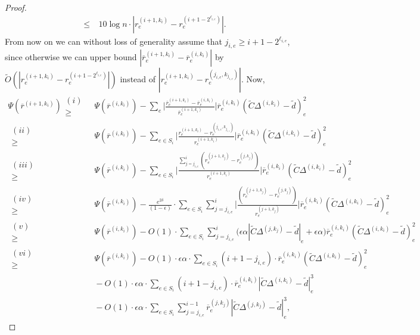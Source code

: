 \documentclass[11pt]{article}
\newcommand\dd{\boldsymbol{\mathit{d}}}
\newcommand\rr{\boldsymbol{\mathit{r}}}
\newcommand\rrbar{\overline{\boldsymbol{\mathit{r}}}}
\newcommand\CC{\boldsymbol{\mathit{C}}}
\newcommand{\wt}{\widetilde}
\newcommand{\ov}{\overline}
\begin{document}
\begin{proof}
\begin{align*}
\leq &~ 10 \log n\cdot |\rr^{(i+1,k_i)}_e - \rr^{(i+1-2^{\ell_{i,e}})}_e|.
\end{align*}
From now on we can without loss of generality assume that $j_{i,e} \geq i+1-2^{\ell_{i,e}}$, since otherwise we can upper bound $|\ov{\rr}^{(i+1,k_i)}_e - \ov{\rr}^{(i ,k_i)}_e|$ by $\wt{O}(|\rr^{(i+1,k_i)}_e - \rr^{(i+1-2^{\ell_{i,e}})}_e|)$ instead of $|\rr_e^{(i+1,k_i)} - \rr_e^{(j_{i,e},k_{j_{i,e}})}|$.
Now,
\begin{align*}
\Psi(\ov{\rr}^{(i+1,k_i)}) 
\substack{(i)\\ \geq} &~ \Psi(\ov{\rr}^{(i,k_i)}) - \sum_e \Big|\frac{\rrbar_e^{(i+1,k_i)}-\ov{\rr}^{(i,k_i)}_e}{\ov{\rr}_e^{(i+1,k_i)}} \Big| \ov{\rr}^{(i,k_i)}_e (\wt{\CC}\Delta^{(i,k_i)}-\wt{\dd})_e^2\\
\substack{(ii)\\ \geq}&~ \Psi(\ov{\rr}^{(i,k_i)}) - \sum_{e \in S_i} \Big|\frac{\rr_e^{(i+1,k_i)} - \rr_e^{(j_{i,e},k_{j_{i,e}})}}{\rr_e^{(i+1,k_i)}} \Big| \ov{\rr}^{(i,k_i)}_e (\wt{\CC}\Delta^{(i,k_i)}-\wt{\dd})_e^2 \\
\substack{(iii)\\ \geq} &~ \Psi(\ov{\rr}^{(i,k_i)}) - \sum_{e \in S_i} \Big|\frac{\sum_{j=j_{i,e}}^{i} (\rr_e^{(j+1,k_j)} - \rr_e^{(j,k_j)}) }{\rr_e^{(i+1,k_i)}} \Big| \ov{\rr}^{(i,k_i)}_e (\wt{\CC}\Delta^{(i,k_i)}-\wt{\dd})_e^2 \\
\substack{(iv)\\ \geq} &~ \Psi(\ov{\rr}^{(i,k_i)}) - \frac{e^{2\delta}}{(1-\epsilon)} \cdot \sum_{e \in S_i} \sum_{j=j_{i,e}}^{i} \Big|\frac{ (\rr_e^{(j+1,k_j)} - \rr_e^{(j,k_j)}) }{\rr_e^{(j+1,k_j)}} \Big| \ov{\rr}^{(i,k_i)}_e (\wt{\CC}\Delta^{(i,k_i)}-\wt{\dd})_e^2 \\
\substack{(v)\\ \geq} &~ \Psi(\ov{\rr}^{(i,k_i)}) - O(1) \cdot \sum_{e \in S_i} \sum_{j=j_{i,e}}^{i} \Big(  \epsilon\alpha |\wt{\CC}\Delta^{(j,k_j)}-\wt{\dd}|_e + \epsilon\alpha \Big) \ov{\rr}^{(i,k_i)}_e (\wt{\CC}\Delta^{(i,k_i)}-\wt{\dd})_e^2 \\
\substack{(vi)\\ \geq} &~ \Psi(\ov{\rr}^{(i,k_i)}) - O(1) \cdot \epsilon \alpha \cdot \sum_{e \in S_i} (i + 1 - j_{i,e}) \cdot \ov{\rr}^{(i,k_i)}_e (\wt{\CC}\Delta^{(i,k_i)}-\wt{\dd})_e^2 \\
&~ - O(1) \cdot \epsilon \alpha \cdot \sum_{e \in S_i} (i + 1 - j_{i,e}) \cdot \ov{\rr}^{(i,k_i)}_e |\wt{\CC}\Delta^{(i,k_i)}-\wt{\dd}|_e^3\\
&~ - O(1) \cdot \epsilon \alpha \cdot \sum_{e \in S_i} \sum_{j=j_{i,e}}^{i-1} \ov{\rr}^{(j,k_j)}_e |\wt{\CC}\Delta^{(j,k_j)}-\wt{\dd}|_e^3,

\end{align*}
\end{proof}
\end{document}
